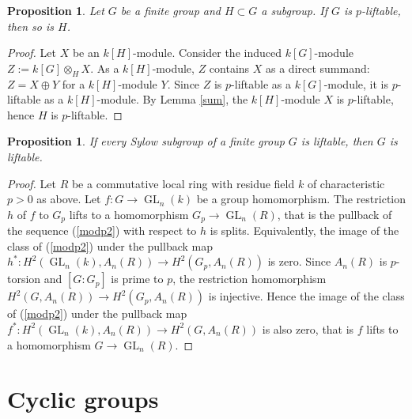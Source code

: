 \documentclass[12pt]{amsart}
\numberwithin{equation}{section}
\newtheorem{proposition}[equation]{Proposition}
\theoremstyle{definition}
\renewcommand{\(}{\bigl(}
\renewcommand{\)}{\bigr)}
\newcommand{\GL}{\operatorname{GL}}
\newcommand{\F}{\mathbb{F}}
\newcommand{\Z}{\mathbb{Z}}
\begin{document}
\begin{proposition}\label{red}\cite[Lemma 2.3]{KL}
Let $G$ be a finite group and $H\subset G$ a subgroup. If $G$ is $p$-liftable, then so is $H$.
\end{proposition}

\begin{proof}


Let $X$ be an $k[H]$-module. Consider the induced $k[G]$-module $Z:=k[G]\otimes_H X$. As a $k[H]$-module, $Z$ contains
$X$ as a direct summand: $Z=X\oplus Y$ for a $k[H]$-module $Y$. Since $Z$ is $p$-liftable as a $k[G]$-module, it is $p$-liftable
as a $k[H]$-module. By Lemma \ref{sum}, the $k[H]$-module $X$ is $p$-liftable, hence $H$ is $p$-liftable.
\end{proof}


\begin{proposition}\label{sylow}\cite[Lemma 2.2]{KL}
If every Sylow subgroup of a finite group $G$ is liftable, then $G$ is liftable.
\end{proposition}
\begin{proof}


Let $R$ be a commutative local ring with residue field $k$ of characteristic $p>0$ as above.
Let $f:G\to \GL_n(k)$ be a group homomorphism. The restriction $h$ of $f$
to $G_p$ lifts to a homomorphism $G_p\to \GL_n(R)$, that is the pullback of the sequence (\ref{modp2})
with respect to $h$ is splits. Equivalently, the image of the class of (\ref{modp2}) under the pullback map
$h^*:H^2(\GL_n(k), A_n(R))\to H^2(G_p, A_n(R))$ is zero.
Since $A_n(R)$ is $p$-torsion and $[G:G_p]$ is prime to $p$,
the restriction homomorphism $H^2(G, A_n(R))\to H^2(G_p, A_n(R))$ is injective. Hence
the image of the class of (\ref{modp2}) under the pullback map
$f^*:H^2(\GL_n(k), A_n(R))\to H^2(G, A_n(R))$ is also zero, that is $f$ lifts to a homomorphism
$G\to \GL_n(R)$.
\end{proof}

\section{Cyclic groups}
\end{document}
